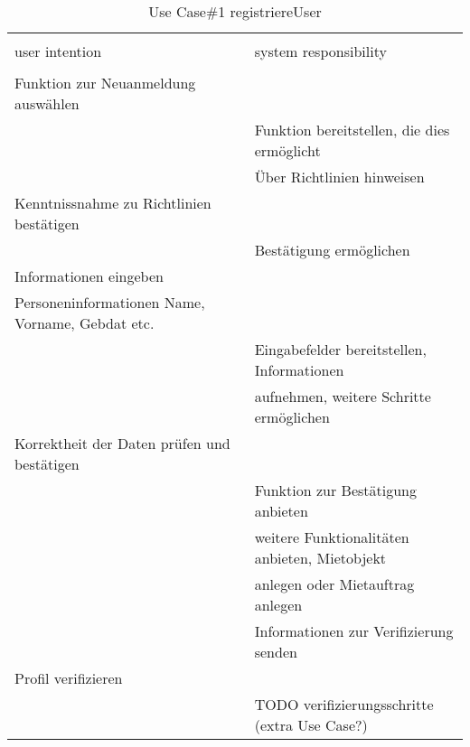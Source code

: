 \begin{table}[H]
\caption{Use Case\#1 registriereUser }
\centering
\begin{tabular}{l l}
\\ [-0.5ex]

\hline\hline
\\ [-0.5ex]
user intention & system responsibility
\\ [1.5ex]
\hline
\\ [-0.5ex]
Funktion zur Neuanmeldung auswählen             &                                   \\[1ex]
                                       & Funktion bereitstellen, die dies ermöglicht   \\[1ex]
                                       & Über Richtlinien hinweisen              \\[1ex]
Kenntnissnahme zu Richtlinien bestätigen        &                                   \\[1ex]
                                       & Bestätigung ermöglichen                 \\[1ex]
Informationen eingeben                       &                                   \\[1ex] 
Personeninformationen Name, Vorname, Gebdat etc.   &                                   \\[1ex] 
                                       & Eingabefelder bereitstellen, Informationen    \\[1ex]
                                       & aufnehmen, weitere Schritte ermöglichen    \\[1ex]
Korrektheit der Daten prüfen und bestätigen        &                                   \\[1ex]
                                       & Funktion zur Bestätigung anbieten          \\[1ex]
                                       & weitere Funktionalitäten anbieten, Mietobjekt \\[1ex]
                                       & anlegen oder Mietauftrag anlegen           \\[1ex]
                                       & Informationen zur Verifizierung senden     \\[1ex]
Profil verifizieren                          &                                   \\[1ex]
                                       & TODO verifizierungsschritte (extra Use Case?) \\[1ex]


\hline
\end{tabular}
\label{tab:anmeldenUC}
\end{table}

